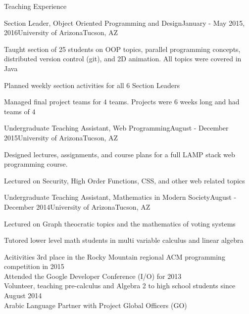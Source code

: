 \documentclass{resume} %
\begin{document}
\begin{rSection}{Teaching Experience}
	
	\begin{rSubsection}{Section Leader, Object Oriented Programming and Design}{January - May 2015, 2016}{University of Arizona}{Tucson, AZ}
		\item Taught section of 25 students on OOP topics, parallel programming concepts, distributed version control (git), and 2D animation. All topics were covered in Java
		\item Planned weekly section activities for all 6 Section Leaders
		\item Managed final project teams for 4 teams. Projects were 6 weeks long and had teams of 4
	\end{rSubsection}
	\begin{rSubsection}{Undergraduate Teaching Assistant, Web Programming}{August - December 2015}{University of Arizona}{Tucson, AZ}
		\item Designed lectures, assignments, and course plans for a full LAMP stack web programming course. 
		\item Lectured on Security, High Order Functions, CSS, and other web related topics
	\end{rSubsection}
	
	\begin{rSubsection}{Undergraduate Teaching Assistant, Mathematics in Modern Society}{August - December 2014}{University of Arizona}{Tucson, AZ}
		\item Lectured on Graph theocratic topics and  the mathematics of voting systems 
		\item Tutored lower level math students in multi variable calculus and linear algebra
	\end{rSubsection}
\end{rSection}


\begin{rSection}{Acitivities}
3rd place in the Rocky Mountain regional ACM programming competition in 2015 \\
Attended the Google Developer Conference (I/O) for 2013 \\
Volunteer, teaching pre-calculus and Algebra 2 to high school students since August 2014 \\
Arabic Language Partner with Project Global Officers (GO) \\
\end{rSection}

\end{document}
